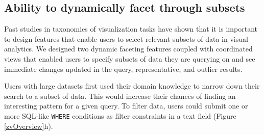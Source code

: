 \subsection{Ability to dynamically facet through subsets}
\par Past studies in taxonomies of visualization tasks have shown that it is important to design features that enable users to select relevant subsets of data in visual analytics\cite{Amar2005,Heer2012}. We designed two dynamic faceting features coupled with coordinated views that enabled users to specify subsets of data they are querying on and see immediate changes updated in the query, representative, and outlier results. 

 Users with large datasets first used their domain knowledge to narrow down their search to a subset of data. This would increase their chances of finding an interesting pattern for a given query. To filter data, users could submit one or more SQL-like \texttt{WHERE} conditions as filter constraints in a text field (Figure \ref{zvOverview}h).  

